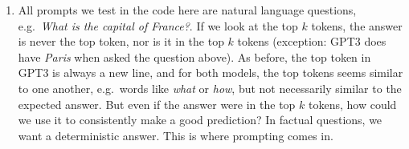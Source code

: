 \documentclass[11pt,a4paper]{article}
\begin{document}
\begin{enumerate}[label=(\alph*)]
    \item All prompts we test in the code here are natural language questions,
          e.g.\ \emph{What is the capital of France?}.
          If we look at the top $k$ tokens, the answer is never the top token,
          nor is it in the top $k$ tokens (exception: GPT3 does have
          \emph{Paris} when asked the question above).
          As before, the top token in GPT3 is always a new line, and for both
          models, the top tokens seems similar to one another, e.g.\ words like
          \emph{what} or \emph{how}, but not necessarily similar to the expected
          answer.
          But even if the answer were in the top $k$ tokens, how could we use it
          to consistently make a good prediction?
          In factual questions, we want a deterministic answer.
          This is where prompting comes in.


\end{enumerate}
\end{document}
